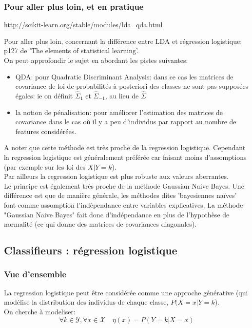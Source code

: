 \documentclass[a4paper]{article}
\theoremstyle{plain}
\begin{document}
\subsubsection{Pour aller plus loin, et en pratique}
\url{http://scikit-learn.org/stable/modules/lda_qda.html}

Pour aller plus loin, concernant la différence entre LDA et régression logistique: p127 de 'The elements of statistical learning'.\\

On peut approfondir le sujet en abordant les pistes suivantes:
\begin{itemize}
\item QDA: pour Quadratic Discriminant Analysis: dans ce cas les matrices de covariance de loi de probabilités à posteriori des classes ne sont pas supposées égales: ie on définit $\hat \Sigma_1$ et $\hat \Sigma_{-1}$, au lieu de $\hat \Sigma$
\item la notion de pénalisation: pour améliorer l'estimation des matrices de covariance dans le cas où il y a peu d'individus par rapport au nombre de features considérées.
\end{itemize}

A noter que cette méthode est très proche de la regression logistique. Cependant la regression logistique est généralement préférée car faisant moins d'assomptions (par exemple sur les loi des $X|Y=k$).\\
Par ailleurs la regression logistique est plus robuste aux valeurs aberrantes.\\

Le principe est également très proche de la méthode Gaussian Naive Bayes.
Une différence est que de manière générale, les méthodes dites 'bayesiennes naïves' font comme assomption l'indépendance entre variables explicatives. La méthode "Gaussian Naive Bayes" fait donc d'indépendance en plus de l'hypothèse de normalité (ce qui donne des matrices de covariances diagonales). 

\pagebreak
\subsection{Classifieurs : régression logistique}

\subsubsection{Vue d'ensemble}

La regression logistique peut être considérée comme une approche générative (qui modélise la distribution des individus de chaque classe, $P(X=x|Y=k$).\\ 
On cherche à modeliser:
$$\forall k \in \mathcal{Y}, \forall x \in \mathcal{X} \quad \eta(x)=P(Y=k|X=x)$$
\end{document}
